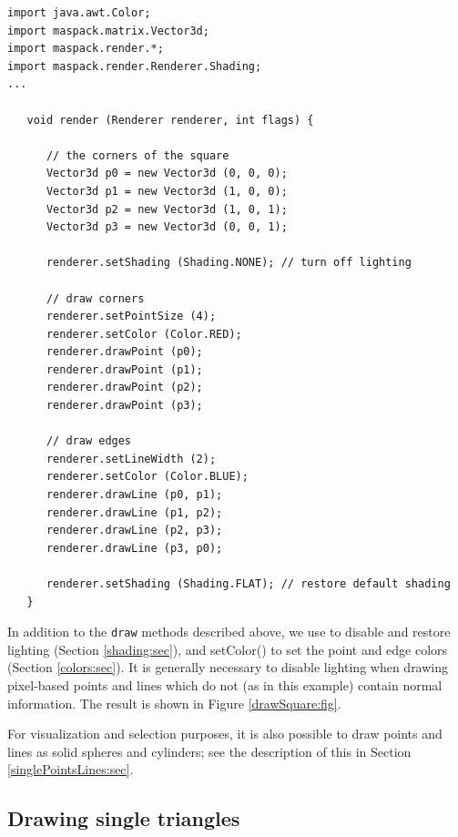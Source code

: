 \begin{lstlisting}[]
import java.awt.Color;
import maspack.matrix.Vector3d;
import maspack.render.*;
import maspack.render.Renderer.Shading;
...

   void render (Renderer renderer, int flags) {
   
      // the corners of the square
      Vector3d p0 = new Vector3d (0, 0, 0);
      Vector3d p1 = new Vector3d (1, 0, 0);
      Vector3d p2 = new Vector3d (1, 0, 1);
      Vector3d p3 = new Vector3d (0, 0, 1);
   
      renderer.setShading (Shading.NONE); // turn off lighting
   
      // draw corners
      renderer.setPointSize (4);
      renderer.setColor (Color.RED);
      renderer.drawPoint (p0);
      renderer.drawPoint (p1);
      renderer.drawPoint (p2);
      renderer.drawPoint (p3);
   
      // draw edges
      renderer.setLineWidth (2);
      renderer.setColor (Color.BLUE);
      renderer.drawLine (p0, p1);
      renderer.drawLine (p1, p2);
      renderer.drawLine (p2, p3);
      renderer.drawLine (p3, p0);
   
      renderer.setShading (Shading.FLAT); // restore default shading
   }
\end{lstlisting}
%
In addition to the {\tt draw} methods described above, we use
 to disable and
restore lighting (Section \ref{shading:sec}), and
%
{setColor()} to set the point and edge colors (Section
\ref{colors:sec}). It is generally necessary to disable lighting when
drawing pixel-based points and lines which do not (as in this example)
contain normal information.  The result is shown in Figure
\ref{drawSquare:fig}.

\begin{sideblock}
For visualization and selection purposes, it is also possible to draw
points and lines as solid spheres and cylinders; see the description
of this in Section \ref{singlePointsLines:sec}.
\end{sideblock}

\subsection{Drawing single triangles}
\label{singleTriangles:sec}


